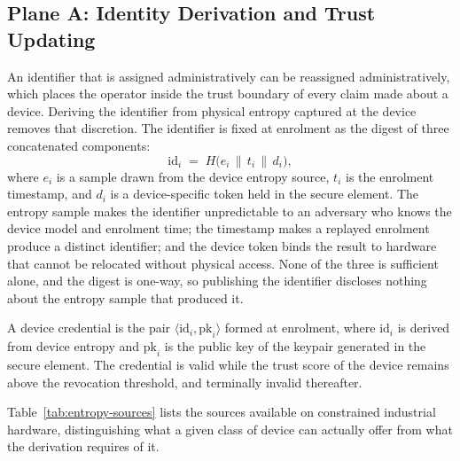 \subsection{Plane A: Identity Derivation and Trust Updating}
\label{sec:plane-a}

An identifier that is assigned administratively can be reassigned administratively, which places the operator inside the trust boundary of every claim made about a device. Deriving the identifier from physical entropy captured at the device removes that discretion. The identifier is fixed at enrolment as the digest of three concatenated components:
\begin{equation}
\label{eq:identity-derive}
\mathrm{id}_i \;=\; H\big( e_i \,\|\, t_i \,\|\, d_i \big) ,
\end{equation}
where $e_i$ is a sample drawn from the device entropy source, $t_i$ is the enrolment timestamp, and $d_i$ is a device-specific token held in the secure element. The entropy sample makes the identifier unpredictable to an adversary who knows the device model and enrolment time; the timestamp makes a replayed enrolment produce a distinct identifier; and the device token binds the result to hardware that cannot be relocated without physical access. None of the three is sufficient alone, and the digest is one-way, so publishing the identifier discloses nothing about the entropy sample that produced it.

\begin{definition}
\label{def:credential}
A device credential is the pair $\langle \mathrm{id}_i, \mathrm{pk}_i \rangle$ formed at enrolment, where $\mathrm{id}_i$ is derived from device entropy and $\mathrm{pk}_i$ is the public key of the keypair generated in the secure element. The credential is valid while the trust score of the device remains above the revocation threshold, and terminally invalid thereafter.
\end{definition}

Table~\ref{tab:entropy-sources} lists the sources available on constrained industrial hardware, distinguishing what a given class of device can actually offer from what the derivation requires of it.

